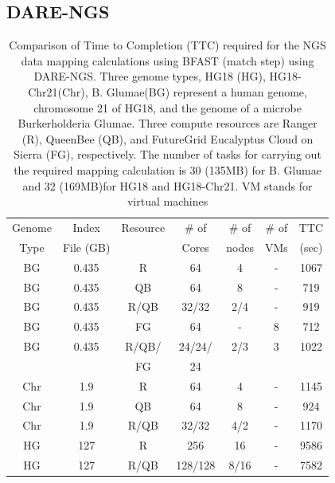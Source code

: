 \documentclass[]{svjour3}
\begin{document}



\subsection{DARE-NGS}


\begin{table}
\centering
\scriptsize
 \begin{tabular}{|c|c|c|c|c|c|c|} 
 \hline 
Genome & Index         & Resource    & \# of & \# of &   \# of         &	TTC  \\
  Type               & File (GB)        & &Cores &   nodes &  VMs&  (sec)\\  
  \hline
 BG &0.435& R&	64 &4&-	&1067 \\
\hline                  
BG &0.435& QB	&	64& 8&-	&719 \\
\hline
 BG &0.435&R/QB	&	32/32 &2/4& -&919 \\
\hline
 BG &0.435& FG &	64 &-&8	&712 \\
\hline
 BG &0.435 &  R/QB/ &	24/24/& 2/3 & 3 &1022\\
 & & FG& 24 &&&\\
\hline
\hline
Chr &1.9& R	&	64& 4 &-&1145 \\
\hline
Chr &1.9& QB	&	64&8&-	&924 \\
\hline
Chr &1.9& R/QB	&	32/32& 4/2&	-&1170 \\
\hline
\hline
HG &127& R	&	256 & 16 &-	&9586\\
\hline
HG &127& R/QB	&	128/128&8/16 & -&7582 \\
\hline
\end{tabular}
\caption{
  Comparison of Time to Completion (TTC) required for the NGS data
  mapping calculations using BFAST (match step) using DARE-NGS. 
  Three genome types,
  HG18 (HG), HG18-Chr21(Chr), B. Glumae(BG) represent a human genome,
  chromosome 21 of HG18, and the genome of a microbe Burkerholderia
  Glumae. Three compute resources are Ranger (R), QueenBee (QB), and
  FutureGrid  Eucalyptus Cloud on Sierra (FG), respectively. The
  number of tasks for carrying out the required mapping calculation is
  30 (135MB) for B. Glumae and 32 (169MB)for HG18 and HG18-Chr21. VM stands for virtual machines
}

  \label{table:NGS-Distributed} 
\end{table}
\end{document}
